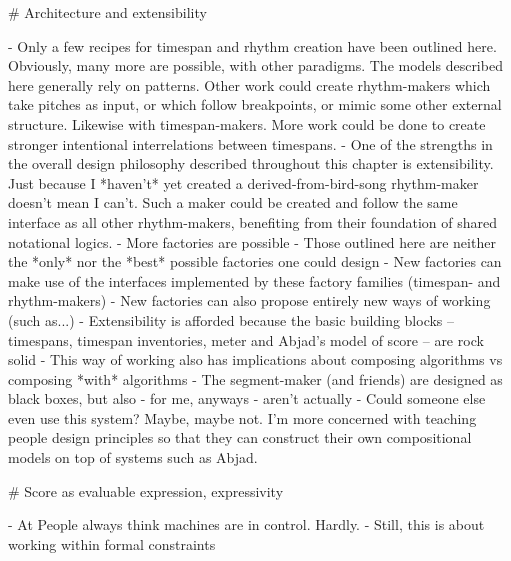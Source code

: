 \begin{markdown}
# Architecture and extensibility

-   Only a few recipes for timespan and rhythm creation have been outlined
    here. Obviously, many more are possible, with other paradigms. The models
    described here generally rely on patterns. Other work could create
    rhythm-makers which take pitches as input, or which follow breakpoints, or
    mimic some other external structure. Likewise with timespan-makers. More
    work could be done to create stronger intentional interrelations between
    timespans.
-   One of the strengths in the overall design philosophy described throughout
    this chapter is extensibility. Just because I *haven't* yet created a
    derived-from-bird-song rhythm-maker doesn't mean I can't. Such a maker
    could be created and follow the same interface as all other rhythm-makers,
    benefiting from their foundation of shared notational logics.
-   More factories are possible
-   Those outlined here are neither the *only* nor the *best* possible
    factories one could design
-   New factories can make use of the interfaces implemented by these
    factory families (timespan- and rhythm-makers)
-   New factories can also propose entirely new ways of working
    (such as...)
-   Extensibility is afforded because the basic building blocks --
    timespans, timespan inventories, meter and Abjad's model of score --
    are rock solid
-   This way of working also has implications about composing algorithms vs
    composing *with* algorithms
-   The segment-maker (and friends) are designed as black boxes, but also - for
    me, anyways - aren't actually
-   Could someone else even use this system? Maybe, maybe not. I'm more
    concerned with teaching people design principles so that they can construct
    their own compositional models on top of systems such as Abjad.

# Score as evaluable expression, expressivity

-   At People always think machines are in control. Hardly.
-   Still, this is about working within formal constraints

\end{markdown}